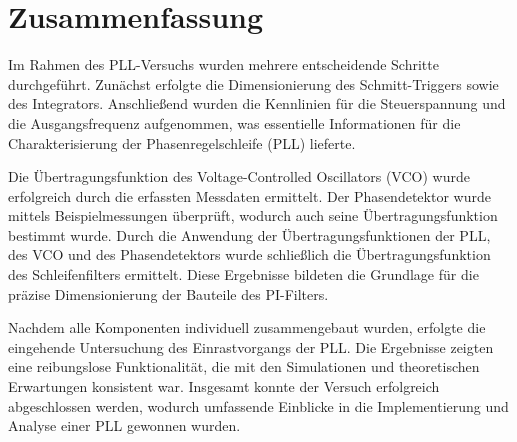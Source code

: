 \section{Zusammenfassung}

Im Rahmen des PLL-Versuchs wurden mehrere entscheidende Schritte durchgeführt. Zunächst erfolgte die Dimensionierung des Schmitt-Triggers sowie des Integrators. Anschließend wurden die Kennlinien für die Steuerspannung und die Ausgangsfrequenz aufgenommen, was essentielle Informationen für die Charakterisierung der Phasenregelschleife (PLL) lieferte.

Die Übertragungsfunktion des Voltage-Controlled Oscillators (VCO) wurde erfolgreich durch die erfassten Messdaten ermittelt. Der Phasendetektor wurde mittels Beispielmessungen überprüft, wodurch auch seine Übertragungsfunktion bestimmt wurde. Durch die Anwendung der Übertragungsfunktionen der PLL, des VCO und des Phasendetektors wurde schließlich die Übertragungsfunktion des Schleifenfilters ermittelt. Diese Ergebnisse bildeten die Grundlage für die präzise Dimensionierung der Bauteile des  PI-Filters.

Nachdem alle Komponenten individuell zusammengebaut wurden, erfolgte die eingehende Untersuchung des Einrastvorgangs der PLL. Die Ergebnisse zeigten eine reibungslose Funktionalität, die mit den Simulationen und theoretischen Erwartungen konsistent war. Insgesamt konnte der Versuch erfolgreich abgeschlossen werden, wodurch umfassende Einblicke in die Implementierung und Analyse einer PLL gewonnen wurden.